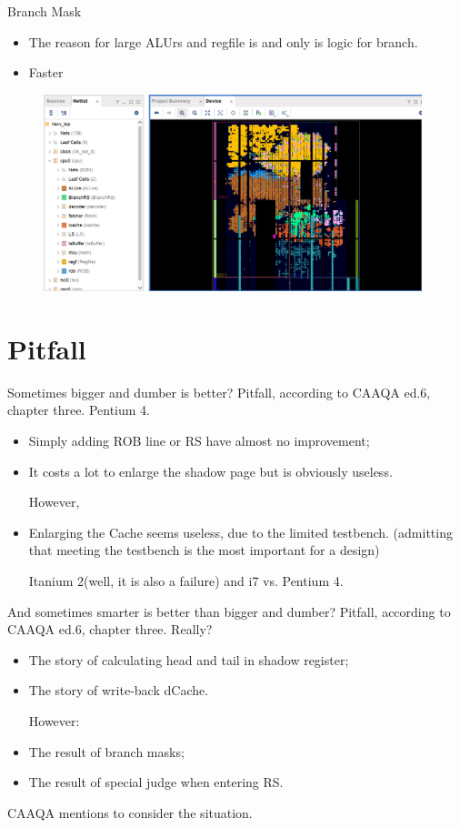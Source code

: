 \documentclass{beamer}
\begin{document}
\begin{frame}{Branch Mask}
    \begin{itemize}
        \item The reason for large ALUrs and regfile is and only is logic for branch. 
        \item Faster
    \end{itemize}
    \begin{figure}
    \includegraphics[width=110mm]{figure.png}
    \end{figure}
\end{frame}

\section{Pitfall}
\begin{frame}{Sometimes bigger and dumber is better?}
    Pitfall, according to CAAQA ed.6, chapter three. Pentium 4. 
    \begin{itemize}
        \item Simply adding ROB line or RS have almost no improvement; 
        \item It costs a lot to enlarge the shadow page but is obviously useless. 
        
        However, 
        
        \item Enlarging the Cache seems useless, due to the limited testbench. 
        (admitting that meeting the testbench is the most important for a design)

        Itanium 2(well, it is also a failure) and i7 vs. Pentium 4. 
    \end{itemize}
\end{frame}

\begin{frame}{And sometimes smarter is better than bigger and dumber?}
    Pitfall, according to CAAQA ed.6, chapter three. Really? 
\begin{itemize}
    \item The story of calculating head and tail in shadow register; 
    \item The story of write-back dCache. 
    
    However: 

    \item The result of branch masks; 
    \item The result of special judge when entering RS. 
\end{itemize}
    CAAQA mentions to consider the situation. 
\end{frame}
\end{document}

